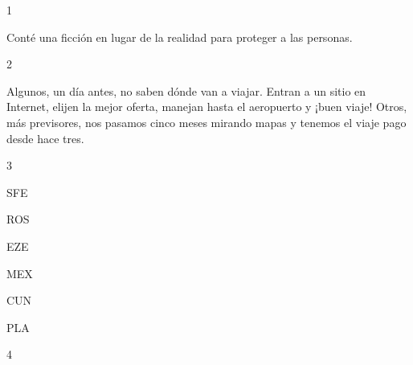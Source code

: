 \documentclass[12pt,twoside,openright,a5paper]{book}
\begin{document}
\cleardoublepage


\hrulefill \hspace{0.1cm}\decofourleft\hspace{0.2cm} 1 \hspace{0.2cm}\decofourright \hspace{0.1cm}\hrulefill

\nopagebreak

\vspace{0.5cm}

\nopagebreak

Conté una ficción en lugar de la realidad para proteger a las personas.

\vspace{0.5cm}

\hrulefill \hspace{0.1cm}\decofourleft\hspace{0.2cm} 2 \hspace{0.2cm}\decofourright \hspace{0.1cm}\hrulefill

\nopagebreak

\vspace{0.5cm}

\nopagebreak

Algunos, un día antes, no saben dónde van a viajar. Entran a un sitio
en Internet, elijen la mejor oferta, manejan hasta el aeropuerto y ¡buen
viaje! Otros, más previsores, nos pasamos cinco meses mirando mapas y
tenemos el viaje pago desde hace tres.

\vspace{0.5cm}

\hrulefill \hspace{0.1cm}\decofourleft\hspace{0.2cm} 3 \hspace{0.2cm}\decofourright \hspace{0.1cm}\hrulefill

\nopagebreak

\vspace{0.5cm}

\nopagebreak

SFE

ROS

EZE

MEX

CUN

PLA

\vspace{0.5cm}

\hrulefill \hspace{0.1cm}\decofourleft\hspace{0.2cm} 4 \hspace{0.2cm}\decofourright \hspace{0.1cm}\hrulefill
\end{document}
